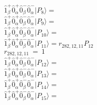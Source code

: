 \documentclass[14pt]{article}
\begin{document}
    $ \hat{1}_{\beta}^{+}\hat{0}_{\alpha}^{+}\hat{0}_{\beta}^{-}\hat{0}_{\alpha}^{-} \vert{P_{8}}\rangle =  $ \\ 
    $ \hat{1}_{\beta}^{+}\hat{0}_{\alpha}^{+}\hat{0}_{\beta}^{-}\hat{0}_{\alpha}^{-} \vert{P_{9}}\rangle =  $ \\ 
    $ \hat{1}_{\beta}^{+}\hat{0}_{\alpha}^{+}\hat{0}_{\beta}^{-}\hat{0}_{\alpha}^{-} \vert{P_{10}}\rangle =  $ \\ 
    $ \hat{1}_{\beta}^{+}\hat{0}_{\alpha}^{+}\hat{0}_{\beta}^{-}\hat{0}_{\alpha}^{-} \vert{P_{11}}\rangle = {r}_{282,12,11}P_{12} $ \\ 
    ${r}_{282,12,11}\ =\ 1 $ \\ 
    $ \hat{1}_{\beta}^{+}\hat{0}_{\alpha}^{+}\hat{0}_{\beta}^{-}\hat{0}_{\alpha}^{-} \vert{P_{12}}\rangle =  $ \\ 
    $ \hat{1}_{\beta}^{+}\hat{0}_{\alpha}^{+}\hat{0}_{\beta}^{-}\hat{0}_{\alpha}^{-} \vert{P_{13}}\rangle =  $ \\ 
    $ \hat{1}_{\beta}^{+}\hat{0}_{\alpha}^{+}\hat{0}_{\beta}^{-}\hat{0}_{\alpha}^{-} \vert{P_{14}}\rangle =  $ \\ 
    $ \hat{1}_{\beta}^{+}\hat{0}_{\alpha}^{+}\hat{0}_{\beta}^{-}\hat{0}_{\alpha}^{-} \vert{P_{15}}\rangle =  $ \\ 
    
\end{document}
